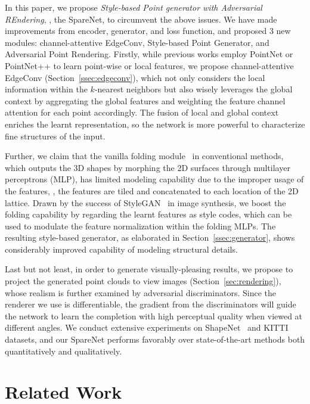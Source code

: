 \documentclass[final]{cvpr}
\begin{document}
In this paper, we propose  \emph{Style-based Point generator with Adversarial REndering}, \ie, the SpareNet, to circumvent the above issues. We have made improvements from encoder, generator, and loss function, and proposed 3 new modules: channel-attentive EdgeConv, Style-based Point Generator, and Adversarial Point Rendering. Firstly, while previous works employ PointNet or PointNet++ to learn point-wise or local features, we propose channel-attentive EdgeConv (Section~\ref{ssec:edgeconv}), which not only considers the local information within the $k$-nearest neighbors but also wisely leverages the global context by aggregating the global features and weighting the feature channel attention for each point accordingly. The fusion of local and global context enriches the learnt representation, so the network is more powerful to characterize fine structures of the input. 

Further, we claim that the vanilla folding module~\cite{foldingnet_2018_CVPR} in conventional methods, which outputs the 3D shapes by morphing the 2D surfaces through multilayer perceptrons (MLP), has limited modeling capability due to the improper usage of the features, \ie, the features are tiled and concatenated to each location of the 2D lattice. Drawn by the success of StyleGAN~\cite{karras2019style} in image synthesis, we boost the folding capability by regarding the learnt features as style codes, which can be used to modulate the feature normalization within the folding MLPs. The resulting style-based generator, as elaborated in Section~\ref{ssec:generator}, shows considerably improved capability of modeling structural details. 

Last but not least, in order to generate visually-pleasing results, we propose to project the generated point clouds to view images (Section~\ref{sec:rendering}), whose realism is further examined by adversarial discriminators. Since the renderer we use is differentiable, the gradient from the discriminators will guide the network to learn the completion with high perceptual quality when viewed at different angles. We conduct extensive experiments on ShapeNet~\cite{chang2015shapenet} and KITTI~\cite{geiger2013vision} datasets, and our SpareNet performs favorably over state-of-the-art methods both quantitatively and qualitatively.


\section{Related Work}
\end{document}
